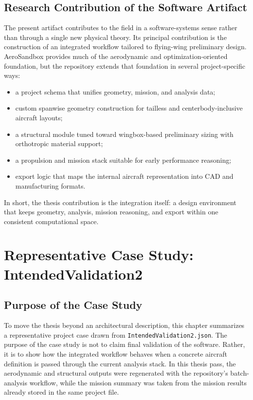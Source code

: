 \documentclass[12pt]{report}
\begin{document}
\section{Research Contribution of the Software Artifact}
The present artifact contributes to the field in a software-systems sense rather than through a single new physical theory. Its principal contribution is the construction of an integrated workflow tailored to flying-wing preliminary design. AeroSandbox provides much of the aerodynamic and optimization-oriented foundation, but the repository extends that foundation in several project-specific ways:
\begin{itemize}
\item a project schema that unifies geometry, mission, and analysis data;
\item custom spanwise geometry construction for tailless and centerbody-inclusive aircraft layouts;
\item a structural module tuned toward wingbox-based preliminary sizing with orthotropic material support;
\item a propulsion and mission stack suitable for early performance reasoning;
\item export logic that maps the internal aircraft representation into CAD and manufacturing formats.
\end{itemize}

In short, the thesis contribution is the integration itself: a design environment that keeps geometry, analysis, mission reasoning, and export within one consistent computational space.

\chapter{Representative Case Study: IntendedValidation2}
\section{Purpose of the Case Study}
To move the thesis beyond an architectural description, this chapter summarizes a representative project case drawn from \texttt{IntendedValidation2.json}. The purpose of the case study is not to claim final validation of the software. Rather, it is to show how the integrated workflow behaves when a concrete aircraft definition is passed through the current analysis stack. In this thesis pass, the aerodynamic and structural outputs were regenerated with the repository's batch-analysis workflow, while the mission summary was taken from the mission results already stored in the same project file.
\end{document}
